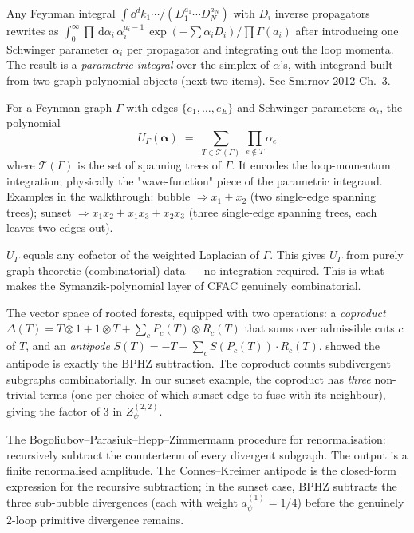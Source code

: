 \documentclass[11pt,a4paper]{article}
\renewcommand{\dd}[1]{\,\mathrm{d}#1}
\theoremstyle{definition}
\theoremstyle{plain}
\begin{document}
\begin{stdbox}
\begin{description}[leftmargin=1em, labelindent=0.5em, style=nextline]
  \item[Schwinger / Feynman parametrisation.]  Any Feynman integral
    $\int \dd^d k_1 \cdots / (D_1^{a_1} \cdots D_N^{a_N})$ with $D_i$
    inverse propagators rewrites as
    $\int_0^\infty\! \prod \dd \alpha_i\,\alpha_i^{a_i - 1} \,
    \exp(-\sum \alpha_i D_i) / \prod \Gamma(a_i)$
    after introducing one Schwinger parameter $\alpha_i$ per propagator
    and integrating out the loop momenta. The result is a
    \emph{parametric integral} over the simplex of $\alpha$'s, with
    integrand built from two graph-polynomial objects (next two
    items).  See Smirnov 2012 \cite{Smirnov2012} Ch.~3.
  \item[Symanzik polynomial $U_\Gamma$ (first kind).]  For a Feynman
    graph $\Gamma$ with edges $\{e_1, \ldots, e_E\}$ and Schwinger
    parameters $\alpha_i$, the polynomial
    \[
      U_\Gamma(\boldsymbol \alpha)
      \;=\; \sum_{T \in \mathcal{T}(\Gamma)}\,
            \prod_{e \notin T} \alpha_e
    \]
    where $\mathcal T(\Gamma)$ is the set of spanning trees of
    $\Gamma$.  It encodes the loop-momentum integration; physically
    the "wave-function" piece of the parametric integrand.  Examples
    in the walkthrough: bubble $\Rightarrow x_1 + x_2$ (two single-edge
    spanning trees); sunset $\Rightarrow x_1 x_2 + x_1 x_3 + x_2 x_3$
    (three single-edge spanning trees, each leaves two edges out).
  \item[Kirchhoff's matrix-tree theorem.]  $U_\Gamma$ equals any
    cofactor of the weighted Laplacian of $\Gamma$.  This gives
    $U_\Gamma$ from purely graph-theoretic (combinatorial) data ---
    no integration required.  This is what makes the Symanzik-polynomial
    layer of CFAC genuinely combinatorial.
  \item[Connes--Kreimer Hopf algebra of rooted trees.]  The vector
    space of rooted forests, equipped with two operations:
    a \emph{coproduct} $\Delta(T) = T \otimes 1 + 1 \otimes T +
    \sum_c P_c(T) \otimes R_c(T)$ that sums over admissible cuts
    $c$ of $T$, and an \emph{antipode}
    $S(T) = -T - \sum_c S(P_c(T)) \cdot R_c(T)$.
    \cite{ConnesKreimer1998,Kreimer1997} showed the antipode is
    exactly the BPHZ subtraction.  The coproduct counts subdivergent
    subgraphs combinatorially.  In our sunset example, the coproduct
    has \emph{three} non-trivial terms (one per choice of which
    sunset edge to fuse with its neighbour), giving the factor of $3$
    in $Z_\psi^{(2,2)}$.
  \item[BPHZ subtraction.]  The Bogoliubov--Parasiuk--Hepp--Zimmermann
    procedure for renormalisation: recursively subtract the
    counterterm of every divergent subgraph.  The output is a finite
    renormalised amplitude.  The Connes--Kreimer antipode is the
    closed-form expression for the recursive subtraction; in the
    sunset case, BPHZ subtracts the three sub-bubble divergences
    (each with weight $a_\psi^{(1)} = 1/4$) before the genuinely
    2-loop primitive divergence remains.
\end{description}
\end{stdbox}
\end{document}
